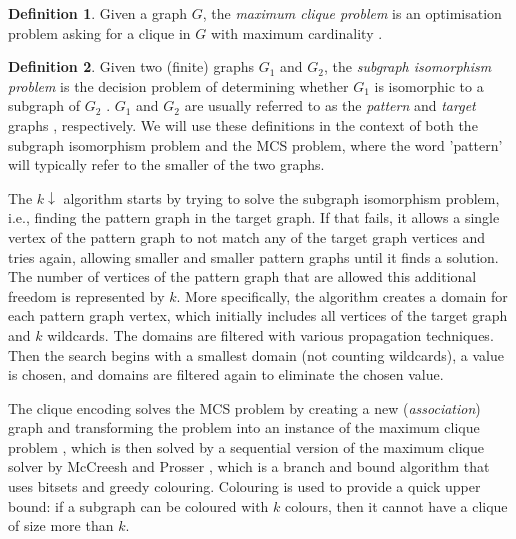 \documentclass{l4proj}
\theoremstyle{definition}
\newtheorem{definition}{Definition}[chapter]
\theoremstyle{remark}
\begin{document}
\begin{definition}
  Given a graph $G$, the \emph{maximum clique problem} is an optimisation problem
  asking for a clique in $G$ with maximum cardinality
  \cite{DBLP:journals/jgo/PardalosX94a}.
\end{definition}

\begin{definition}
  Given two (finite) graphs $G_1$ and $G_2$, the \emph{subgraph isomorphism
    problem} is the decision problem of determining whether $G_1$ is isomorphic
  to a subgraph of $G_2$ \cite{DBLP:conf/stoc/Cook71}. $G_1$ and $G_2$ are
  usually referred to as the \emph{pattern} and \emph{target} graphs
  \cite{DBLP:journals/ai/Solnon10, Valiente97analgorithm,
    DBLP:journals/constraints/ZampelliDS10}, respectively. We will use these
  definitions in the context of both the subgraph isomorphism problem and the
  MCS problem, where the word 'pattern' will typically refer to the smaller of
  the two graphs.
\end{definition}

The $k{\downarrow}$ algorithm \cite{DBLP:conf/aaai/HoffmannMR17} starts by
trying to solve the subgraph isomorphism problem, i.e., finding the pattern
graph in the target graph. If that fails, it allows a single vertex of the
pattern graph to not match any of the target graph vertices and tries again,
allowing smaller and smaller pattern graphs until it finds a solution. The
number of vertices of the pattern graph that are allowed this additional freedom
is represented by $k$. More specifically, the algorithm creates a domain for
each pattern graph vertex, which initially includes all vertices of the target
graph and $k$ wildcards. The domains are filtered with various propagation
techniques. Then the search begins with a smallest domain (not counting
wildcards), a value is chosen, and domains are filtered again to eliminate the
chosen value.

The clique encoding \cite{DBLP:conf/cp/McCreeshNPS16} solves the MCS problem by
creating a new (\emph{association}) graph and transforming the problem into an
instance of the maximum clique problem \cite{Levi1973}, which is then solved by
a sequential version of the maximum clique solver by McCreesh and Prosser
\cite{DBLP:journals/topc/McCreeshP15}, which is a branch and bound algorithm
that uses bitsets and greedy colouring. Colouring is used to provide a quick
upper bound: if a subgraph can be coloured with $k$ colours, then it cannot have
a clique of size more than $k$.
\end{document}

